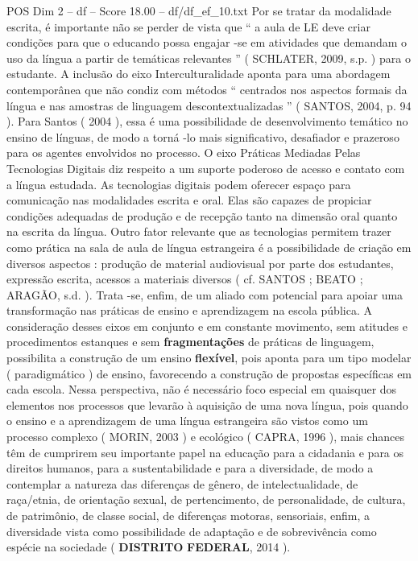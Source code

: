 \begin{textsample}{POS Dim 2 – df – Score 18.00 – df/df\_ef\_10.txt}
Por se tratar da modalidade escrita, é importante não se perder de vista que “ a aula de LE deve criar condições para que o educando possa engajar -se em atividades que demandam o uso da língua a partir de temáticas relevantes ” ( SCHLATER, 2009, s.p. ) para o estudante.
A inclusão do eixo Interculturalidade aponta para uma abordagem contemporânea que não condiz com métodos “ centrados nos aspectos formais da língua e nas amostras de linguagem descontextualizadas ” ( SANTOS, 2004, p. 94 ).
Para Santos ( 2004 ), essa é uma possibilidade de desenvolvimento temático no ensino de línguas, de modo a torná -lo mais significativo, desafiador e prazeroso para os agentes envolvidos no processo.
O eixo Práticas Mediadas Pelas Tecnologias Digitais diz respeito a um suporte poderoso de acesso e contato com a língua estudada.
As tecnologias digitais podem oferecer espaço para comunicação nas modalidades escrita e oral.
Elas são capazes de propiciar condições adequadas de produção e de recepção tanto na dimensão oral quanto na escrita da língua.
Outro fator relevante que as tecnologias permitem trazer como prática na sala de aula de língua estrangeira é a possibilidade de criação em diversos aspectos : produção de material audiovisual por parte dos estudantes, expressão escrita, acessos a materiais diversos ( cf.
SANTOS ; BEATO ; ARAGÃO, s.d. ).
Trata -se, enfim, de um aliado com potencial para apoiar uma transformação nas práticas de ensino e aprendizagem na escola pública.
A consideração desses eixos em conjunto e em constante movimento, sem atitudes e procedimentos estanques e sem \textbf{fragmentações} de práticas de linguagem, possibilita a construção de um ensino \textbf{flexível}, pois aponta para um tipo modelar ( paradigmático ) de ensino, favorecendo a construção de propostas específicas em cada escola.
Nessa perspectiva, não é necessário foco especial em quaisquer dos elementos nos processos que levarão à aquisição de uma nova língua, pois quando o ensino e a aprendizagem de uma língua estrangeira são vistos como um processo complexo ( MORIN, 2003 ) e ecológico ( CAPRA, 1996 ), mais chances têm de cumprirem seu importante papel na educação para a cidadania e para os direitos humanos, para a sustentabilidade e para a diversidade, de modo a contemplar a natureza das diferenças de gênero, de intelectualidade, de raça/etnia, de orientação sexual, de pertencimento, de personalidade, de cultura, de patrimônio, de classe social, de diferenças motoras, sensoriais, enfim, a diversidade vista como possibilidade de adaptação e de sobrevivência como espécie na sociedade ( \textbf{DISTRITO} \textbf{FEDERAL}, 2014 ).

\end{textsample}
